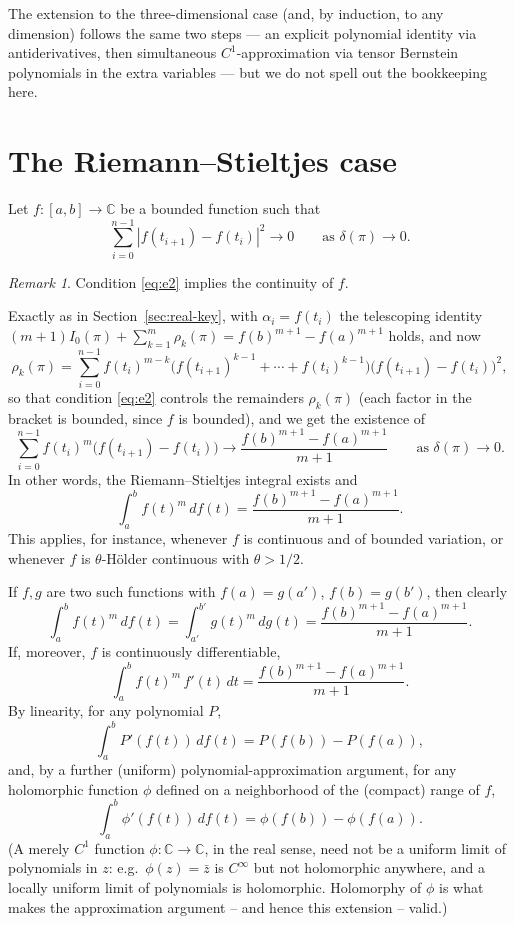 \documentclass[11pt,fleqn]{article}
\def\C{\mathbb C}
\theoremstyle{plain}
\theoremstyle{remark}
\newtheorem{remark}[thm]{Remark}
\begin{document}
The extension to the three-dimensional case (and, by induction, to any
dimension) follows the same two steps --- an explicit polynomial identity
via antiderivatives, then simultaneous $C^1$-approximation via
tensor Bernstein polynomials in the extra variables --- but we do not
spell out the bookkeeping here.

\section{The Riemann--Stieltjes case}

Let $f\colon[a,b]\to\C$ be a bounded function such that
\begin{equation}\label{eq:e2}
\sum_{i=0}^{n-1}|f(t_{i+1})-f(t_i)|^2\longrightarrow0
\qquad\text{as }\delta(\pi)\to0.
\end{equation}

\begin{remark}
Condition \eqref{eq:e2} implies the continuity of $f$.
\end{remark}

Exactly as in Section~\ref{sec:real-key}, with $\alpha_i=f(t_i)$ the
telescoping identity $(m+1)I_0(\pi)+\sum_{k=1}^m\rho_k(\pi)=f(b)^{m+1}-f(a)^{m+1}$
holds, and now
\[
\rho_k(\pi)=\sum_{i=0}^{n-1}f(t_i)^{m-k}\big(f(t_{i+1})^{k-1}+\cdots+f(t_i)^{k-1}\big)\big(f(t_{i+1})-f(t_i)\big)^2,
\]
so that condition \eqref{eq:e2} controls the remainders
$\rho_k(\pi)$ (each factor in the bracket is bounded, since $f$ is
bounded), and we get the existence of
\[
\sum_{i=0}^{n-1}f(t_i)^m\big(f(t_{i+1})-f(t_i)\big)
\longrightarrow\frac{f(b)^{m+1}-f(a)^{m+1}}{m+1}
\qquad\text{as }\delta(\pi)\to0.
\]
In other words, the Riemann--Stieltjes integral exists and
\[
\int_a^bf(t)^m\,df(t)=\frac{f(b)^{m+1}-f(a)^{m+1}}{m+1}.
\]
This applies, for instance, whenever $f$ is continuous and of bounded
variation, or whenever $f$ is $\theta$-H\"older continuous with
$\theta>1/2$.

If $f,g$ are two such functions with $f(a)=g(a')$, $f(b)=g(b')$, then
clearly
\[
\int_a^bf(t)^m\,df(t)=\int_{a'}^{b'}g(t)^m\,dg(t)
=\frac{f(b)^{m+1}-f(a)^{m+1}}{m+1}.
\]
If, moreover, $f$ is continuously differentiable,
\[
\int_a^bf(t)^m\,f'(t)\,dt=\frac{f(b)^{m+1}-f(a)^{m+1}}{m+1}.
\]
By linearity, for any polynomial $P$,
\[
\int_a^bP'(f(t))\,df(t)=P(f(b))-P(f(a)),
\]
and, by a further (uniform) polynomial-approximation argument, for any
holomorphic function $\phi$ defined on a neighborhood of the (compact)
range of $f$,
\[
\int_a^b\phi'(f(t))\,df(t)=\phi(f(b))-\phi(f(a)).
\]
(A merely $C^1$ function $\phi\colon\C\to\C$, in the real sense, need not
be a uniform limit of polynomials in $z$: e.g.\ $\phi(z)=\bar z$ is
$C^\infty$ but not holomorphic anywhere, and a locally uniform limit of
polynomials is holomorphic. Holomorphy of $\phi$ is what makes the
approximation argument -- and hence this extension -- valid.)
\end{document}
